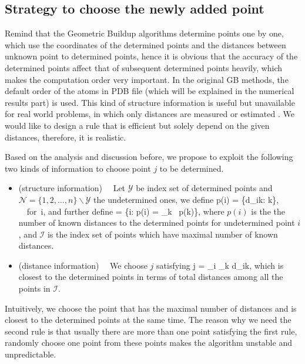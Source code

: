 \documentclass[a4paper,12pt]{article}
\begin{document}
\subsection{Strategy to choose the newly added point}
Remind that the Geometric Buildup algorithms determine points one by one, which use the coordinates of the determined points and the distances between unknown point to determined points, hence it is obvious that the accuracy of the determined points affect that of subsequent determined points heavily, which makes the computation order very important. In the original GB methods, the default order of the atoms in PDB file (which will be explained in the numerical results part) is used. This kind of structure information is useful but unavailable for real world problems, in which only distances are measured or estimated \cite{Dong2002}. We would like to design a rule that is efficient but solely depend on the given distances, therefore, it is realistic.

Based on the analysis and discussion before, we propose to exploit the following two kinds of information to choose point $j$ to be determined.
\begin{itemize}
    \item (structure information)%
    ~~Let $\mathcal{Y}$ be index set of determined points and $\mathcal{N} = \{1,2,\ldots,n\}\backslash \mathcal{Y}$ the undetermined ones, we define
    \be p(i) = \sharp \{d_{ik}: k\in {}\}, ~~for~i\in {}, \label{rule1} \ee
    and further define
    \be {} = \{i: p(i) = \max_{k\in {}} ~p(k)\}, \label{rule2}\ee
    where $p(i)$ is the the number of known distances to the determined points for undetermined point $i$, and $\mathcal{I}$ is the index set of points which have maximal number of known distances.
    \item (distance information)%
    ~~We choose $j$ satisfying
    \be j = \arg\min_{i\in {}} \sum_{k\in {}} d_{ik}, \label{rule3}\ee
    which is closest to the determined points in terms of total distances among all the points in $\mathcal{I}$.
\end{itemize}
Intuitively, we choose the point that has the maximal number of distances and is closest to the determined points at the same time. The reason why we need the second rule is that usually there are more than one point satisfying the first rule, randomly choose one point from these points makes the algorithm unstable and unpredictable.
\end{document}
